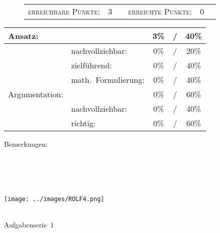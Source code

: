 \documentclass{article}
\begin{document}
\vspace{-0.5cm}
\begin{figure}[h!]
\begin{tabular}{crcrcr}
\textsc{erreichbare Punkte:} &3& & \textsc{erreichte Punkte:} &0
\end{tabular}
\end{figure}
\vspace{-0.1cm}
\begin{minipage}[t]{0.6\textwidth}
\flushleft
\begin{tabular}{l|lccc}
Ansatz:& &3\%&/&40\%\\\hline
&nachvollziehbar:&0\%&/&20\%\\
&zielf{\"u}hrend:&0\%&/&40\%\\
&math.~Formulierung:& 0\%&/&40\%\\\hline\hline
Argumentation:& &0\%&/&60\%\\\hline
&nachvollziehbar:&0\%&/&40\%\\
&richtig:&0\%&/&60\%\\\hline
\end{tabular}
\end{minipage}
\hfill
\begin{minipage}[t]{0.4\textwidth}
	\vspace{-1.75cm}
	Bemerkungen:\\\vspace*{0.2cm}
	\underline{\hspace{0.75\textwidth}}\\\vspace*{0.2cm}
	\underline{\hspace{0.75\textwidth}}
	\\\vspace*{0.2cm}
	\underline{\hspace{0.75\textwidth}}
	\\\vspace*{0.2cm}
	\underline{\hspace{0.75\textwidth}}
	\\\vspace*{0.2cm}
	\underline{\hspace{0.75\textwidth}}
\end{minipage}
	\vspace{0.5cm}\clearpage\vspace*{-2cm}
\parbox{4cm}{\texttt{[image: ../images/ROLF4.png]}}
\parbox{10.6cm}{ \\ Aufgabenserie~1  \\ \vspace*{-.5cm} }
\end{document}
